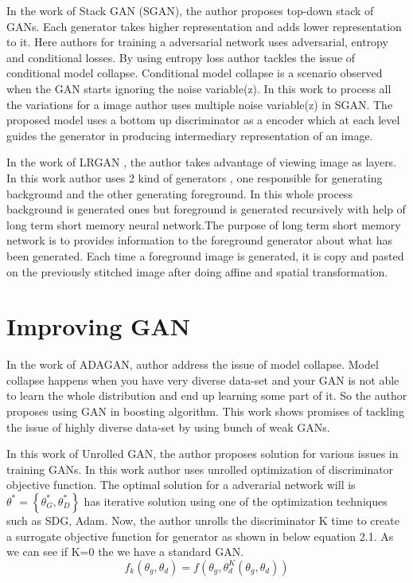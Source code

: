 In the work of Stack GAN (SGAN)\cite{stacked-gan}, the author proposes top-down stack of GANs. Each generator takes higher representation and adds lower representation to it. Here authors for training  a adversarial network uses adversarial, entropy and conditional losses. By using entropy loss author tackles the issue of conditional model collapse. Conditional model collapse  is a  scenario	observed	when	the	GAN	starts	ignoring the noise variable(z). In this work to process all the variations for a image author uses multiple noise variable(z) in SGAN. The proposed model uses a bottom up discriminator as a encoder which at each level guides the generator in producing intermediary representation of an image.

In the work of LRGAN \cite{LR-GAN}, the author takes advantage of viewing image as layers. In this work author uses 2 kind of generators , one responsible for generating background and the other generating foreground. In this whole process background is generated ones but foreground is generated recursively with help of long term short memory neural network\cite{hochreiter1997long}.The purpose of long term short memory network is to  provides information to the foreground generator about what has been generated. Each time a foreground image is generated, it is copy and pasted on the previously stitched image after doing affine and spatial transformation\cite{1506.02025}. 

\section{Improving GAN}

In the work of ADAGAN, author address the issue of model collapse. Model collapse happens when you have very diverse data-set and your GAN is not able to learn the whole distribution and end up learning some part of it. So the author proposes using GAN in boosting algorithm. This work shows promises of tackling the issue of highly diverse data-set by using bunch of weak GANs.
\par

In this work of Unrolled GAN, the author proposes solution for various issues in training GANs. 
In this work author uses unrolled optimization of discriminator objective function.  The optimal solution for a adverarial network will is $\theta^{*} =\left\{\theta^{*}_{G}, \theta^{*}_{D}\right\}$ has iterative solution using one of the optimization techniques such as SDG, Adam. Now, the author unrolls the discriminator K time to create a surrogate objective function for generator as shown in below equation 2.1. As we can see if K=0 the we have a standard GAN.
\begin{equation}
f_{k}{ \left( \theta _{g}, \theta _{d} \right) }=f \left( \theta _{g}, \theta _{d}^{K}{ \left( \theta _{g}, \theta _{d} \right) } \right)
\end{equation}

